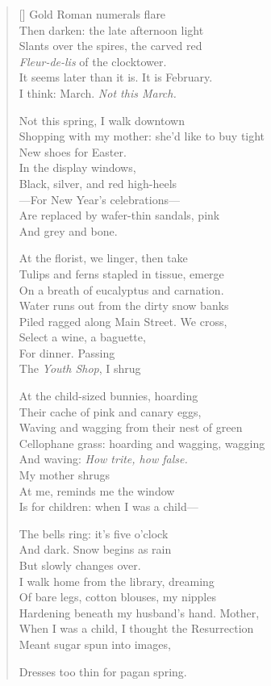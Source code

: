 \label{ch:requiescat}
\settowidth{\versewidth}{Shopping with my mother: she'd like to buy tight}
\begin{verse}[\versewidth]
Gold Roman numerals flare\\
Then darken: the late afternoon light\\
Slants over the spires, the carved red\\
\textit{Fleur-de-lis} of the clocktower.\\
It seems later than it is. It is February.\\
I think: March. \textit{Not this March.}

Not this spring, I walk downtown\\
Shopping with my mother: she'd like to buy tight\\
New shoes for Easter.\\
In the display windows,\\
Black, silver, and red high-heels\\
---For New Year's celebrations---\\
Are replaced by wafer-thin sandals, pink\\
And grey and bone.

At the florist, we linger, then take\\
Tulips and ferns stapled in tissue, emerge\\
On a breath of eucalyptus and carnation.\\
Water runs out from the dirty snow banks\\
Piled ragged along Main Street. \qquad We cross,\\
Select a wine, a baguette,\\
For dinner. \qquad Passing\\
The \textit{Youth Shop}, I shrug

At the child-sized bunnies, hoarding\\
Their cache of pink and canary eggs,\\
Waving and wagging from their nest of green\\
Cellophane grass: hoarding and wagging, wagging\\
And waving: \textit{How trite, how false.}\\
My mother shrugs\\
At me, reminds me the window\\
Is for children: when I was a child---

The bells ring: it's five o'clock\\
And dark. Snow begins as rain\\
But slowly changes over.\\
I walk home from the library, dreaming\\
Of bare legs, cotton blouses, my nipples\\
Hardening beneath my husband's hand.   Mother,\\
When I was a child, I thought the Resurrection\\
Meant sugar spun into images,

Dresses too thin for pagan spring.
\end{verse}
